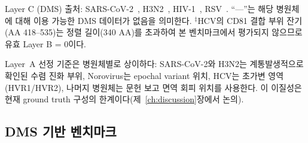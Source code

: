 \begin{table}[htbp]
\centering
\caption{병원체별 3계층 ground truth 위치 수 (아미노산 수준, 0-based)}
\label{tab:gt_positions}
\small
{}
\begin{minipage}{\textwidth}
\smallskip
\footnotesize Layer C (DMS) 출처: SARS-CoV-2~\cite{dadonaite2023dms}, H3N2~\cite{lee2018h3n2dms}, HIV-1~\cite{haddox2018hiv1dms}, RSV~\cite{simonich2025rsvdms}.
``---''는 해당 병원체에 대해 이용 가능한 DMS 데이터가 없음을 의미한다.
$^\ddagger$HCV의 CD81 결합 부위 잔기(AA 418--535)는 정렬 길이(340 AA)를 초과하여 본 벤치마크에서 평가되지 않으므로 유효 Layer B = 0이다.

Layer~A 선정 기준은 병원체별로 상이하다: SARS-CoV-2와 H3N2는 계통발생적으로 확인된 수렴 진화 부위, Norovirus는 epochal variant 위치, HCV는 초가변 영역(HVR1/HVR2), 나머지 병원체는 문헌 보고 면역 회피 위치를 사용한다. 이 이질성은 현재 ground truth 구성의 한계이다(제~\ref{ch:discussion}장에서 논의).
\end{minipage}
\end{table}

\subsection{DMS 기반 벤치마크}
\label{subsec:dms_ground_truth}

